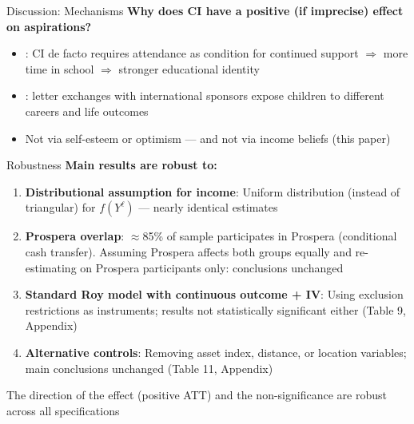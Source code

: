 \documentclass[aspectratio=169, 10pt]{beamer}
\begin{document}
\begin{frame}{Discussion: Mechanisms}
  \textbf{Why does CI have a positive (if imprecise) effect on aspirations?}
  \begin{itemize}
    \item {}: CI de facto requires attendance as condition for continued support $\Rightarrow$ more time in school $\Rightarrow$ stronger educational identity
    \item {}: letter exchanges with international sponsors expose children to different careers and life outcomes
    \item Not via self-esteem or optimism \citep{Ross2021} — and not via income beliefs (this paper)
  \end{itemize}
\end{frame}

\begin{frame}{Robustness}
  \textbf{Main results are robust to:}

  \begin{enumerate}
    \item \textbf{Distributional assumption for income}: Uniform distribution (instead of triangular) for $f(Y^\ell)$ — nearly identical estimates
    \item \textbf{Prospera overlap}: $\approx$85\% of sample participates in Prospera (conditional cash transfer). Assuming Prospera affects both groups equally and re-estimating on Prospera participants only: conclusions unchanged
    \item \textbf{Standard Roy model with continuous outcome + IV}: Using exclusion restrictions as instruments; results not statistically significant either (Table 9, Appendix)
    \item \textbf{Alternative controls}: Removing asset index, distance, or location variables; main conclusions unchanged (Table 11, Appendix)
  \end{enumerate}

  \vspace{0.3em}
  \begin{keybox}
    The direction of the effect (positive ATT) and the non-significance are robust across all specifications
  \end{keybox}
\end{frame}
\end{document}
